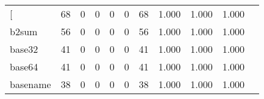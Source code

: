 \begin{longtable}{lp{1.2cm}p{1.2cm}p{1.2cm}p{1.2cm}p{1.2cm}p{1.2cm}p{1.2cm}p{1.2cm}p{1.2cm}p{1.2cm}}
\bottomrule
\endlastfoot
{[}         &                                    68 &                                                  0 &                                                  0 &                                                  0 &                                                  0 &                                                 68 &                                              1.000 &                                              1.000 &                                              1.000 \\
b2sum     &                                    56 &                                                  0 &                                                  0 &                                                  0 &                                                  0 &                                                 56 &                                              1.000 &                                              1.000 &                                              1.000 \\
base32    &                                    41 &                                                  0 &                                                  0 &                                                  0 &                                                  0 &                                                 41 &                                              1.000 &                                              1.000 &                                              1.000 \\
base64    &                                    41 &                                                  0 &                                                  0 &                                                  0 &                                                  0 &                                                 41 &                                              1.000 &                                              1.000 &                                              1.000 \\
basename  &                                    38 &                                                  0 &                                                  0 &                                                  0 &                                                  0 &                                                 38 &                                              1.000 &                                              1.000 &                                              1.000 \\

\end{longtable}
